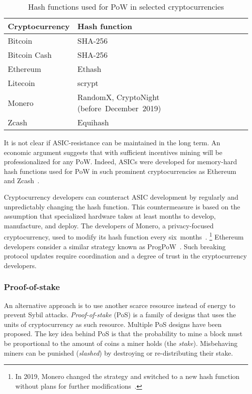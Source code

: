 \begin{table}[]
	\begin{tabular}{|l|l|}
		\hline
		\textbf{Cryptocurrency} & \textbf{Hash function} \\ \hline
		Bitcoin & SHA-256 \\ \hline
		Bitcoin Cash & SHA-256 \\ \hline
		Ethereum & Ethash \\ \hline
		Litecoin & scrypt \\ \hline
		Monero & RandomX, CryptoNight (before~December~2019) \\ \hline
		Zcash & Equihash \\ \hline
	\end{tabular}
	\caption{Hash functions used for PoW in selected cryptocurrencies}
	\label{tab:pow-coins-hash-functions}
\end{table}

It is not clear if ASIC-resistance can be maintained in the long term.
An economic argument suggests that with sufficient incentives mining will be professionalized for any PoW.
Indeed, ASICs were developed for memory-hard hash functions used for PoW in such prominent cryptocurrencies as Ethereum~\cite{OLeary2018} and Zcash~\cite{Floyd2018}.

Cryptocurrency developers can counteract ASIC development by regularly and unpredictably changing the hash function.
This countermeasure is based on the assumption that specialized hardware takes at least months to develop, manufacture, and deploy.
The developers of Monero, a privacy-focused cryptocurrency, used to modify its hash function every six~months~\cite{Kim2019}.
\footnote{In 2019, Monero changed the strategy and switched to a new hash function without plans for further modifications~\cite{dEBRUYNE2019}.}
Ethereum developers consider a similar strategy known as ProgPoW~\cite{OLeary2019}.
Such breaking protocol updates require coordination and a degree of trust in the cryptocurrency developers.


\subsubsection*{Proof-of-stake}

An alternative approach is to use another scarce resource instead of energy to prevent Sybil attacks.
\textit{Proof-of-stake} (PoS) is a family of designs that uses the units of cryptocurrency as such resource.
Multiple PoS designs have been proposed.
The key idea behind PoS is that the probability to mine a block must be proportional to the amount of coins a miner holds (the \textit{stake}).
Misbehaving miners can be punished (\textit{slashed}) by destroying or re-distributing their stake.

